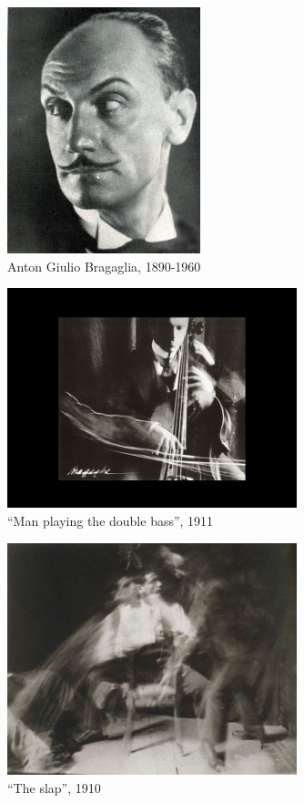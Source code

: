\documentclass[
  french,
]{book}
\begin{document}
\begin{figure}
\centering
\includegraphics[width=0.5\textwidth,height=\textheight]{medias/corpus/bragaglia/Bragaglia_a_giulio.jpg}
\caption{Anton Giulio Bragaglia, 1890-1960}
\end{figure}

\begin{figure}
\centering
\includegraphics[width=0.75\textwidth,height=\textheight]{medias/corpus/bragaglia/Anton-Giulio-Bragaglia-fotodinamica-02.jpg}
\caption{``Man playing the double bass'', 1911}
\end{figure}

\begin{figure}
\centering
\includegraphics[width=0.75\textwidth,height=\textheight]{medias/corpus/bragaglia/Anton-Giulio-Bragaglia-fotodinamica-04.jpg}
\caption{``The slap'', 1910}
\end{figure}
\end{document}
